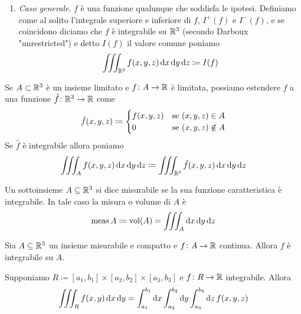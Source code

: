 \begin{definition}
\begin{enumerate}
		\item \emph{Caso generale}. $ f $ è una funzione qualunque che soddisfa le ipotesi. Definiamo come al solito l'integrale superiore e inferiore di $ f $, $ I^+(f) $ e $ I^-(f) $, e se coincidono diciamo che $ f $ è integrabile su $ \mathbb{R}^3 $ (secondo Darboux "unrestricted") e detto $ I(f) $ il valore comune poniamo
		\begin{equation}
			\iiint_{\R^3} f(x, y, z) \dif{x} \dif{y} \dif{z} \coloneqq I(f)
		\end{equation}
	\end{enumerate}
	Se $ A \subset \mathbb{R}^3 $ è un insieme limitato e $ f \colon A \to \mathbb{R} $ è limitata, possiamo estendere $ f $ a una funzione $ \hat{f} \colon \mathbb{R}^3 \to \mathbb{R} $ come 
	\begin{equation*}
		\hat{f}(x, y, z) \coloneqq 
		\begin{cases}
		f(x, y, z) & \text{se $ (x, y, z) \in A$} \\
		0 & \text{se $ (x, y, z) \notin A $}
		\end{cases}
	\end{equation*}
	Se $ \hat{f} $ è integrabile allora poniamo 
	\begin{equation*}
		\iiint_{A} f(x, y, z) \dif{x} \dif{y} \dif{z} \coloneqq \iiint_{\R^3} \hat{f}(x, y, z) \dif{x} \dif{y} \dif{z}
	\end{equation*}
\end{definition}

\begin{definition}
	Un sottoinsieme $ A \subseteq \mathbb{R}^3 $ si dice misurabile se la sua funzione caratteristica è integrabile. In tale caso la misura o volume di $ A $ è  
	\begin{equation}
	\meas{A} \coloneqq \mathrm{vol}(A) = \iiint_{A} \dif{x} \dif{y} \dif{z}
	\end{equation}
\end{definition}

\begin{thm}
	Sia $ A \subseteq \mathbb{R}^3 $ un insieme misurabile e compatto e $ f \colon A \to \mathbb{R} $ continua. Allora $ f $ è integrabile su $ A $.
\end{thm}

\begin{definition}
	Supponiamo $ R \coloneqq [a_1, b_1] \times [a_2, b_2] \times [a_3, b_3] $ e $ f \colon R \to \mathbb{R} $ integrabile. Allora 
	\begin{equation}
		\iiint_{R} f(x, y) \dif{x} \dif{y} = \int_{a_1}^{b_1} \dif{x} \int_{a_2}^{b_2} \dif{y} \int_{a_3}^{b_3} \dif{z} \, f(x, y, z) 
	\end{equation}
\end{definition}

